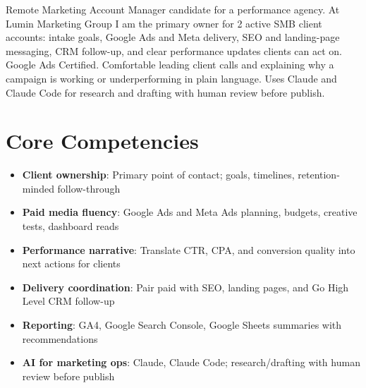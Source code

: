 \documentclass[11pt,a4paper,sans]{moderncv}
\begin{document}
\makecvtitle

\vspace{6pt}
\small{Remote Marketing Account Manager candidate for a performance agency. At Lumin Marketing Group I am the primary owner for 2 active SMB client accounts: intake goals, Google Ads and Meta delivery, SEO and landing-page messaging, CRM follow-up, and clear performance updates clients can act on. Google Ads Certified. Comfortable leading client calls and explaining why a campaign is working or underperforming in plain language. Uses Claude and Claude Code for research and drafting with human review before publish.}

\section{Core Competencies}
\vspace{1pt}
\begin{itemize}
\item \textbf{Client ownership}: Primary point of contact; goals, timelines, retention-minded follow-through
\item \textbf{Paid media fluency}: Google Ads and Meta Ads planning, budgets, creative tests, dashboard reads
\item \textbf{Performance narrative}: Translate CTR, CPA, and conversion quality into next actions for clients
\item \textbf{Delivery coordination}: Pair paid with SEO, landing pages, and Go High Level CRM follow-up
\item \textbf{Reporting}: GA4, Google Search Console, Google Sheets summaries with recommendations
\item \textbf{AI for marketing ops}: Claude, Claude Code; research/drafting with human review before publish
\end{itemize}
\end{document}
